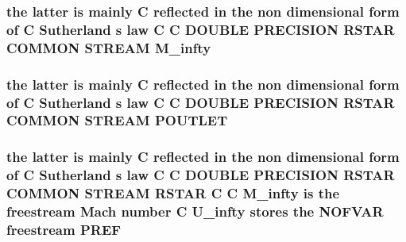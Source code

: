 \hypertarget{home_2abonfi_2_c_f_d__codes_2_eul_f_s_83_84_2include_2stream_8com_a57c765efd76d44669f6966962bda2d72}{
\subsubsection[{M\-\_\-infty}]{\setlength{\rightskip}{0pt plus 5cm}the latter is mainly C reflected in the non dimensional form of C Sutherland s law C C D\-O\-U\-B\-L\-E P\-R\-E\-C\-I\-S\-I\-O\-N R\-S\-T\-A\-R C\-O\-M\-M\-O\-N S\-T\-R\-E\-A\-M M\-\_\-infty}}\label{home_2abonfi_2_c_f_d__codes_2_eul_f_s_83_84_2include_2stream_8com_a57c765efd76d44669f6966962bda2d72}
\hypertarget{home_2abonfi_2_c_f_d__codes_2_eul_f_s_83_84_2include_2stream_8com_a42c20c83e2242ab14c0d4178f49679c8}{
\subsubsection[{P\-O\-U\-T\-L\-E\-T}]{\setlength{\rightskip}{0pt plus 5cm}the latter is mainly C reflected in the non dimensional form of C Sutherland s law C C D\-O\-U\-B\-L\-E P\-R\-E\-C\-I\-S\-I\-O\-N R\-S\-T\-A\-R C\-O\-M\-M\-O\-N S\-T\-R\-E\-A\-M P\-O\-U\-T\-L\-E\-T}}\label{home_2abonfi_2_c_f_d__codes_2_eul_f_s_83_84_2include_2stream_8com_a42c20c83e2242ab14c0d4178f49679c8}
\hypertarget{home_2abonfi_2_c_f_d__codes_2_eul_f_s_83_84_2include_2stream_8com_ac527abdf107d6bddcbc6a80631e1ab59}{
\subsubsection[{P\-R\-E\-F}]{\setlength{\rightskip}{0pt plus 5cm}the latter is mainly C reflected in the non dimensional form of C Sutherland s law C C D\-O\-U\-B\-L\-E P\-R\-E\-C\-I\-S\-I\-O\-N R\-S\-T\-A\-R C\-O\-M\-M\-O\-N S\-T\-R\-E\-A\-M R\-S\-T\-A\-R C C {\bf M\-\_\-infty} is the freestream Mach number C {\bf U\-\_\-infty} stores the N\-O\-F\-V\-A\-R freestream P\-R\-E\-F}}\label{home_2abonfi_2_c_f_d__codes_2_eul_f_s_83_84_2include_2stream_8com_ac527abdf107d6bddcbc6a80631e1ab59}
